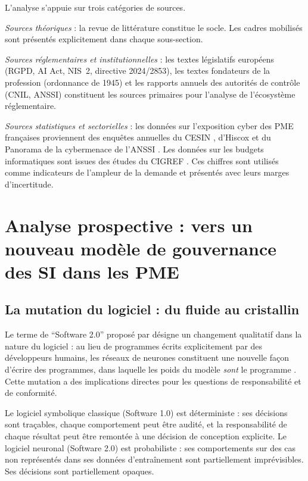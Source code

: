 \documentclass[12pt,a4paper]{article}
\begin{document}
L'analyse s'appuie sur trois catégories de sources.

\textit{Sources théoriques} : la revue de littérature constitue le socle. Les cadres mobilisés sont présentés explicitement dans chaque sous-section.

\textit{Sources réglementaires et institutionnelles} : les textes législatifs européens (RGPD, AI Act, NIS~2, directive 2024/2853), les textes fondateurs de la profession (ordonnance de 1945) et les rapports annuels des autorités de contrôle (CNIL, ANSSI) constituent les sources primaires pour l'analyse de l'écosystème réglementaire.

\textit{Sources statistiques et sectorielles} : les données sur l'exposition cyber des PME françaises proviennent des enquêtes annuelles du CESIN \parencite{cesin2025}, d'Hiscox \parencite{hiscox2024} et du Panorama de la cybermenace de l'ANSSI \parencite{anssi2025}. Les données sur les budgets informatiques sont issues des études du CIGREF \parencite{cigref2023}. Ces chiffres sont utilisés comme indicateurs de l'ampleur de la demande et présentés avec leurs marges d'incertitude.

\section{Analyse prospective : vers un nouveau modèle de gouvernance des SI dans les PME}

\subsection{La mutation du logiciel : du fluide au cristallin}

Le terme de \enquote{Software 2.0} proposé par \textcite{karpathy2017} désigne un changement qualitatif dans la nature du logiciel : au lieu de programmes écrits explicitement par des développeurs humains, les réseaux de neurones constituent une nouvelle façon d'écrire des programmes, dans laquelle les poids du modèle \emph{sont} le programme \parencite{lecun2015}. Cette mutation a des implications directes pour les questions de responsabilité et de conformité.

Le logiciel symbolique classique (Software 1.0) est déterministe : ses décisions sont traçables, chaque comportement peut être audité, et la responsabilité de chaque résultat peut être remontée à une décision de conception explicite. Le logiciel neuronal (Software 2.0) est probabiliste : ses comportements sur des cas non représentés dans ses données d'entraînement sont partiellement imprévisibles. Ses décisions sont partiellement opaques.
\end{document}
